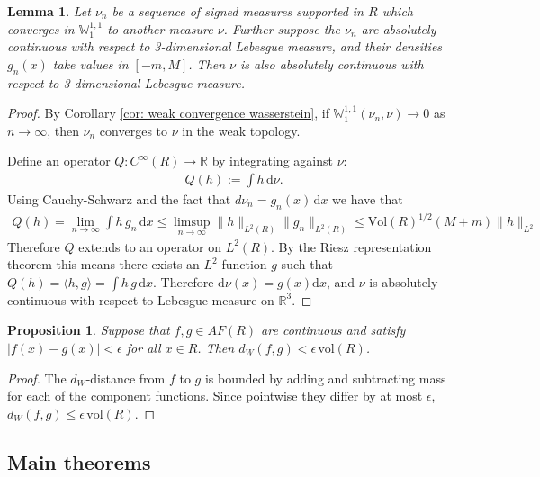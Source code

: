 \documentclass[11pt]{article}
\newtheorem{lemma}[thm]{Lemma}
\newtheorem{prop}[thm]{Proposition}
\theoremstyle{remark}
\theoremstyle{definition}
\newcommand{\norm}[1] {\| #1\|}
\newcommand{\m}[1]{\mathbb{#1}}
\newcommand{\dd}{\mathrm{d}}
\begin{document}
\begin{lemma}\label{lem:boundedlimits}
	Let $\nu_n$ be a sequence of signed measures supported in $R$ which converges in $\m W_1^{1,1}$ to another measure $\nu$. Further suppose the $\nu_n$ are absolutely continuous with respect to 3-dimensional Lebesgue measure, and their densities $g_n(x)$ take values in $[-m,M]$. Then $\nu$ is also absolutely continuous with respect to 3-dimensional Lebesgue measure. 
\end{lemma}
\begin{proof}
    By Corollary \ref{cor: weak convergence wasserstein}, if $\m W_1^{1,1}(\nu_n,\nu)\to 0$ as $n\to \infty$, then $\nu_n$ converges to $\nu$ in the weak topology. 
    
    Define an operator $Q: C^\infty(R)\to \mathbb{R}$ by integrating against $\nu$: 
    \begin{align*}
        Q(h) := \int h \, \dd \nu. 
    \end{align*}
    Using Cauchy-Schwarz and the fact that $d\nu_n = g_n(x)\, \dd x$ we have that 
    \begin{align*}
        Q(h) = \lim_{n\to \infty} \int h \, g_n \, \dd x \leq \limsup_{n\to \infty} \norm{h}_{L^2(R)} \norm{g_n}_{L^2(R)} \leq \text{Vol}(R)^{1/2} (M+m)\norm{h}_{L^2}
    \end{align*}
    Therefore $Q$ extends to an operator on $L^2(R)$. By the Riesz representation theorem this means there exists an $L^2$ function $g$ such that $Q(h) = \langle h,g\rangle = \int h\,g \,\dd x$. Therefore $\dd\nu(x) = g(x) \dd x$, and $\nu$ is absolutely continuous with respect to Lebesgue measure on $\mathbb{R}^3$.
\end{proof}

\begin{prop}\label{prop: wass vs sup}
	Suppose that $f,g \in AF(R)$ are continuous and satisfy $|f(x)-g(x)| < \epsilon$ for all $x\in R$. Then $d_W(f,g) < \epsilon \,\text{vol}(R)$.
\end{prop}
\begin{proof}
	The $d_W$-distance from $f$ to $g$ is bounded by adding and subtracting mass for each of the component functions. Since pointwise they differ by at most $\epsilon$,  $d_W(f,g)\leq \epsilon\, \text{vol}(R)$. 
\end{proof}

\subsection{Main theorems}
\end{document}
